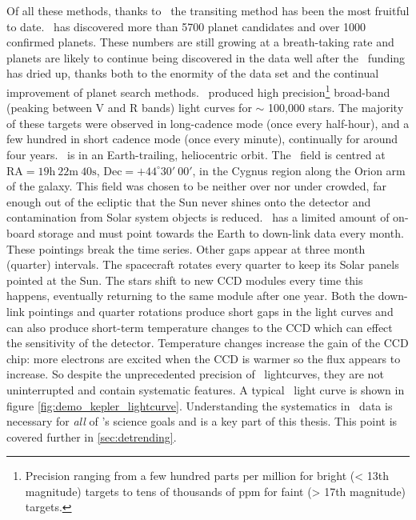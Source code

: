 Of all these methods, thanks to \kepler\ the transiting method has been the
most fruitful to date.
\kepler\ has discovered more than 5700 planet candidates and over 1000
confirmed planets.
These numbers are still growing at a breath-taking rate and planets are likely
to continue being discovered in the data well after the \kepler\ funding has
dried up, thanks both to the enormity of the data set and the continual
improvement of planet search methods.
\kepler\ produced high precision\footnote{Precision ranging from a few hundred
parts per million for bright (< 13th magnitude) targets to tens of thousands
of ppm for faint (> 17th magnitude) targets.} broad-band (peaking between V
and R bands) light curves for $\sim$ 100,000 stars.
The majority of these targets were observed in long-cadence mode (once every
half-hour), and a few hundred in short cadence mode (once every minute),
continually for around four years.
\kepler\ is in an Earth-trailing, heliocentric orbit.
The \kepler\ field is centred at $\mathrm{RA} = 19\mathrm{h}~22\mathrm{m}~
40\mathrm{s}$, $\mathrm{Dec} = +44^\circ30'~00'$, in the Cygnus region along
the Orion arm of the galaxy.
This field was chosen to be neither over nor under crowded, far enough out of
the ecliptic that the Sun never shines onto the detector and contamination
from Solar system objects is reduced.
\kepler\ has a limited amount of on-board storage and must point towards the
Earth to down-link data every month.
These pointings break the time series.
Other gaps appear at three month (quarter) intervals.
The spacecraft rotates every quarter to keep its Solar panels pointed at the
Sun.
The stars shift to new CCD modules every time this happens, eventually
returning to the same module after one year.
Both the down-link pointings and quarter rotations produce short gaps in the
light curves and can also produce short-term temperature changes to the CCD
which can effect the sensitivity of the detector.
Temperature changes increase the gain of the CCD chip: more electrons are
excited when the CCD is warmer so the flux appears to increase.
So despite the unprecedented precision of \kepler\ lightcurves, they are not
uninterrupted and contain systematic features.
A typical \kepler\ light curve is shown in figure
\ref{fig:demo_kepler_lightcurve}.
Understanding the systematics in \kepler\ data is necessary for {\it all} of
\kepler's science goals and is a key part of this thesis.
This point is covered further in \textsection \ref{sec:detrending}.

